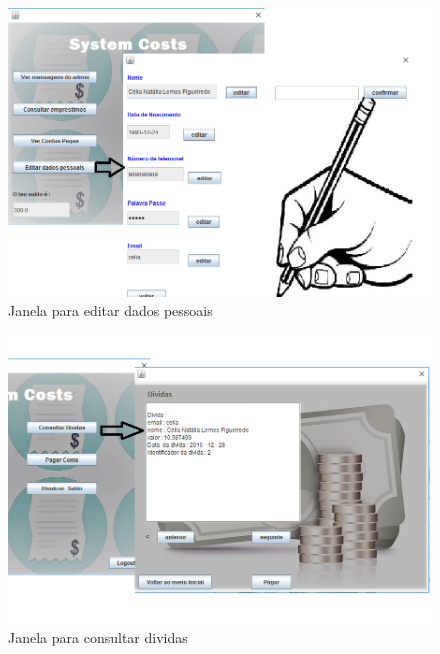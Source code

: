 \begin{figure}[h!]
	\centering
	\includegraphics[scale=0.6]{imagens/interface/editardadosmorador}  
	\caption{Janela para editar dados pessoais}  
\end{figure}

\clearpage

\begin{figure}[h!]
	\centering
	\includegraphics[scale=0.6]{imagens/interface/consultardividasmorador}  
	\caption{Janela para consultar dividas}  
\end{figure}

\clearpage

